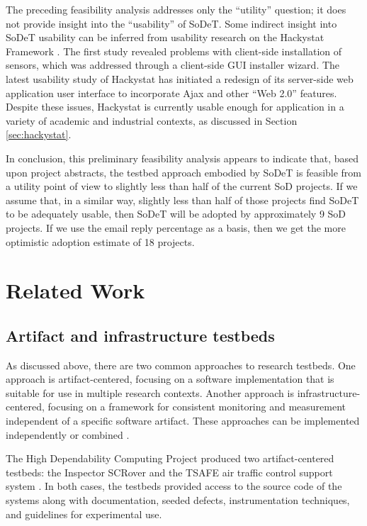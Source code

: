 The preceding feasibility analysis addresses only the ``utility'' question;
it does not provide insight into the ``usability'' of SoDeT.  Some
indirect insight into SoDeT usability can be inferred from usability
research on the Hackystat Framework \cite{csdl2-03-12,csdl2-07-02}.  The
first study revealed problems with client-side installation of sensors,
which was addressed through a client-side GUI installer wizard.  The latest
usability study of Hackystat has initiated a redesign of its server-side
web application user interface to incorporate Ajax and other ``Web 2.0''
features.  Despite these issues, Hackystat is currently usable enough for
application in a variety of academic and industrial contexts, as discussed
in Section \ref{sec:hackystat}.

In conclusion, this preliminary feasibility analysis appears to indicate
that, based upon project abstracts, the testbed approach embodied by SoDeT
is feasible from a utility point of view to slightly less than half of the
current SoD projects.  If we assume that, in a similar way, slightly less
than half of those projects find SoDeT to be adequately usable, then SoDeT
will be adopted by approximately 9 SoD projects.  If we use the email reply
percentage as a basis, then we get the more optimistic adoption estimate of
18 projects.

\section{Related Work}

\subsection{Artifact and infrastructure testbeds}

As discussed above, there are two common approaches to research
testbeds. One approach is artifact-centered, focusing on a software
implementation that is suitable for use in multiple research contexts.
Another approach is infrastructure-centered, focusing on a framework for
consistent monitoring and measurement independent of a specific software
artifact.  These approaches can be implemented independently or combined
\cite{Lindvall05}.

The High Dependability Computing Project produced two artifact-centered
testbeds: the Inspector SCRover \cite{Boehm04b} and the TSAFE air
traffic control support system \cite{Dennis03}.  In both cases, the
testbeds provided access to the source code of the systems along with
documentation, seeded defects, instrumentation techniques, and guidelines
for experimental use.

